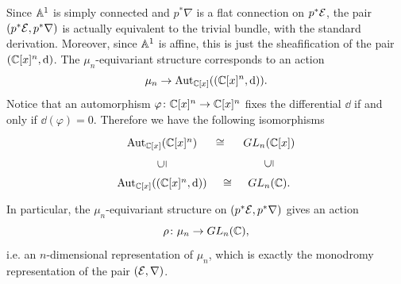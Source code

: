 Since $\mathbb{A}^1$ is simply connected and $p^*\nabla$ is a flat connection on $p^*\mathcal{E}$, the pair $(p^*\mathcal{E}, p^*\nabla)$ is actually equivalent to the trivial bundle, with the standard derivation. Moreover, since $\mathbb{A}^1$ is affine, this is just the sheafification of the pair $(\mathbb{C}[x]^n, \mathop{}\!\mathrm{d})$. The $\mu_n$-equivariant structure corresponds to an action
\begin{equation}
\mu_n \to \operatorname{Aut}_{\mathbb{C}[x]}( (\mathbb{C}[x]^n, \mathop{}\!\mathrm{d}) ).
\end{equation}
Notice that an automorphism $\varphi\colon \mathbb{C}[x]^n \to \mathbb{C}[x]^n$ fixes the differential $\dd$ if and only if $\dd(\varphi) = 0$. Therefore we have the following isomorphisms
\begin{equation}
\begin{tikzcd}
	{\Aut_{\Cb[x]}(\Cb[x]^n)} & {GL_n(\Cb[x])} \\
	{\Aut_{\Cb[x]}((\Cb[x]^n, \dd))} & {GL_n(\Cb).}
	\arrow["\cong"{marking, allow upside down}, draw=none, from=1-1, to=1-2]
	\arrow["\subseteq"{marking, allow upside down}, draw=none, from=2-1, to=1-1]
	\arrow["\cong"{marking, allow upside down}, draw=none, from=2-1, to=2-2]
	\arrow["\subseteq"{marking, allow upside down}, draw=none, from=2-2, to=1-2]
\end{tikzcd}
\end{equation}
In particular, the $\mu_n$-equivariant structure on $(p^*\mathcal{E}, p^*\nabla)$ gives an action
\begin{equation}
\rho \colon \mu_n \to GL_n(\mathbb{C}),
\end{equation}
i.e. an $n$-dimensional representation of $\mu_n$, which is exactly the monodromy representation of the pair $(\mathcal{E}, \nabla)$.

